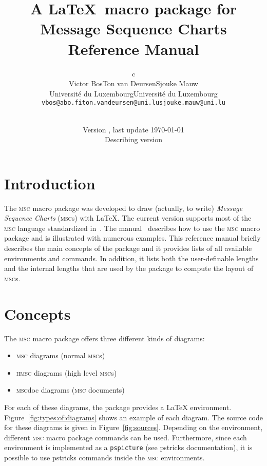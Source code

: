 \documentclass[a4paper]{article}
\title{
  A \LaTeX\ macro package for Message Sequence Charts\\{\large Reference Manual}
}
\author{
 \begin{tabular}{c}
  \begin{tabular}{ccc}
   Victor Bos &
   Ton van Deursen &
   Sjouke Mauw \\
   &
   \scriptsize Universit\'e du Luxembourg &
   \scriptsize Universit\'e du Luxembourg \\[-0.8ex]
   \scriptsize \texttt{vbos@abo.fi} &
   \scriptsize \texttt{ton.vandeursen@uni.lu} & 
   \scriptsize \texttt{sjouke.mauw@uni.lu}
  \end{tabular}\\
 \end{tabular}
}
\date{\small Version \mscversion, last update \today\\
      Describing \mscpack{} version \mscversion}
\newcommand{\acro}[1]{{\scshape\lowercase{#1}}}
\newcommand\MSC{\acro{MSC}}
\newcommand\HMSC{\acro{HMSC}}
\newcommand{\MSCdoc}{\MSC{}doc}
\newcommand{\mscpack}{\MSC{} macro package}
\begin{document}
\maketitle

\tableofcontents

\section{Introduction}

The \mscpack{} was developed to draw (actually, to write)
\emph{Message Sequence Charts} (\MSC{}s) with \LaTeX. The current
version supports most of the \MSC{} language standardized
in~\cite{z120}.  The manual~\cite{BM02a} describes how to use the
\mscpack{} and is illustrated with numerous examples.  This reference manual
briefly describes the main concepts of the package and it provides
lists of all available environments and commands. In addition, it
lists both the user-definable lengths and the internal lengths that
are used by the package to compute the layout of \MSC{}s.
\section{Concepts}

The \mscpack{} offers three different kinds
of diagrams: 

\begin{itemize}
\item \MSC{} diagrams (normal \MSC{}s)
\item \HMSC{} diagrams (high level \MSC{}s)
\item \MSCdoc{} diagrams (\MSC{} documents) 
\end{itemize}
For each of these diagrams, the package provides a \LaTeX{}
environment. Figure~\ref{fig:types:of:diagrams} shows an example of
each diagram. The source code for these diagrams is given in
Figure~\ref{fig:sources}. Depending on the environment, different
\mscpack{} commands can be used. Furthermore, since each environment
is implemented as a \texttt{pspicture} (see \textsf{pstricks}
documentation), it is possible to use \textsf{pstricks} commands
inside the \MSC{} environments.
\end{document}
